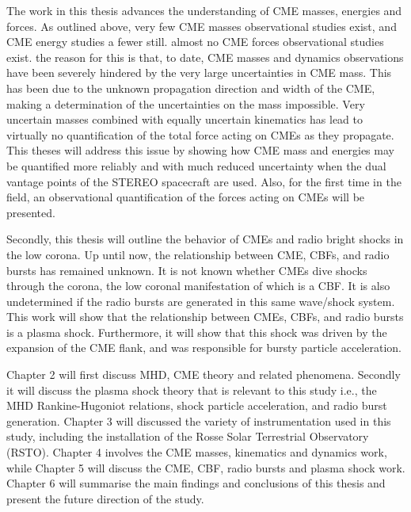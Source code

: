 The work in this thesis advances the understanding of CME masses, energies and forces. As outlined above, very few CME masses observational studies exist, and CME energy studies a fewer still. almost no CME forces observational studies exist. the reason for this is that, to date, CME masses and dynamics observations have been severely hindered by the very large uncertainties in CME mass. This has been due to the unknown propagation direction and width of the CME, making a determination of the uncertainties on the mass impossible. Very uncertain masses combined with equally uncertain kinematics has lead to virtually no quantification of the total force acting on CMEs as they propagate. This theses will address this issue by showing how CME mass and energies may be quantified more reliably and with much reduced uncertainty when the dual vantage points of the STEREO spacecraft are used. Also, for the first time in the field, an observational quantification of the forces acting on CMEs will be presented. 

Secondly, this thesis will outline the behavior of CMEs and radio bright shocks in the low corona. Up until now, the relationship between CME, CBFs, and radio bursts has remained unknown. It is not known whether CMEs dive shocks through the corona, the low coronal manifestation of which is a CBF. It is also undetermined if the radio bursts are generated in this same wave/shock system. This work will show that the relationship between CMEs, CBFs, and radio bursts is a plasma shock. Furthermore, it will show that this shock was driven by the expansion of the CME flank, and was responsible for bursty particle acceleration.

Chapter 2 will first discuss MHD, CME theory and related phenomena. Secondly it will discuss the plasma shock theory that is relevant to this study i.e., the MHD Rankine-Hugoniot relations, shock particle acceleration, and radio burst generation. Chapter 3 will discussed the variety of instrumentation used in this study, including the installation of the Rosse Solar Terrestrial Observatory (RSTO). Chapter 4 involves the CME masses, kinematics and dynamics work, while Chapter 5 will discuss the CME, CBF, radio bursts and plasma shock work. Chapter 6 will summarise the main findings and conclusions of this thesis and present the future direction of the study.
